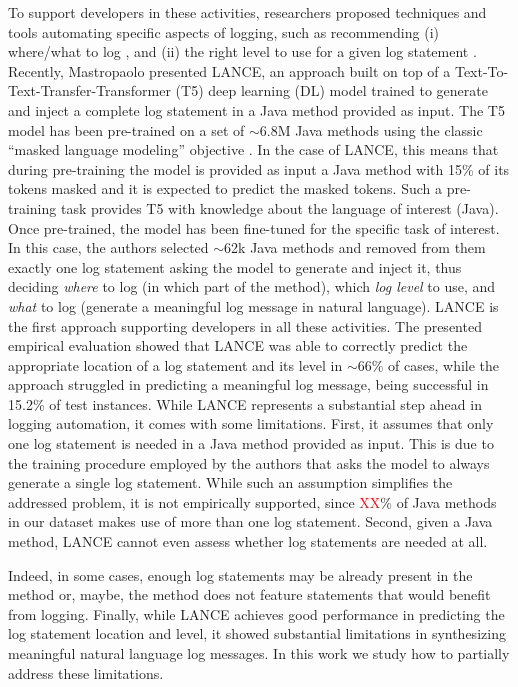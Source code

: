 To support developers in these activities, researchers proposed techniques and tools automating specific aspects of logging, such as recommending (i) where/what to log \cite{yuan2010sherlog,jia2018smartlog,li2018studying,li2020shall}, and (ii) the right level to use for a given log statement \cite{yuan2012characterizing,oliner2012advances,li2017log,li2020qualitative,li2021deeplv}. Recently, Mastropaolo \etal \cite{mastropaolo2022using} presented LANCE, an approach built on top of a Text-To-Text-Transfer-Transformer (T5) deep learning (DL) model \cite{raffel2019exploring} trained to generate and inject a complete log statement in a Java method provided as input. The T5 model has been pre-trained on a set of $\sim$6.8M Java methods using the classic ``masked language modeling'' objective \cite{raffel2019exploring}. In the case of LANCE, this means that during pre-training the model is provided as input a Java method with 15\% of its tokens masked and it is expected to predict the masked tokens. Such a pre-training task provides T5 with knowledge about the language of interest (\ie Java). Once pre-trained, the model has been fine-tuned for the specific task of interest. In this case, the authors selected $\sim$62k Java methods and removed from them exactly one log statement asking the model to generate and inject it, thus deciding \emph{where} to log (\ie in which part of the method), which \emph{log level} to use, and \emph{what} to log (\ie generate a meaningful log message in natural language). LANCE is the first approach supporting developers in all these activities. The presented empirical evaluation showed that LANCE was able to correctly predict the appropriate location of a log statement and its level in $\sim$66\% of cases, while the approach struggled in predicting a meaningful log message, being successful in 15.2\% of test instances. While LANCE represents a substantial step ahead in logging automation, it comes with some limitations. First, it assumes that only one log statement is needed in a Java method provided as input. This is due to the training procedure employed by the authors that asks the model to always generate a single log statement. While such an assumption simplifies the addressed problem, it is not empirically supported, since \textcolor{red}{XX}\% of Java methods in our dataset makes use of more than one log statement. Second, given a Java method, LANCE cannot even assess whether log statements are needed at all. 

\eject

Indeed, in some cases, enough log statements may be already present in the method or, maybe, the method does not feature statements that would benefit from logging. Finally,  while LANCE achieves good performance in predicting the log statement location and level, it showed substantial limitations in synthesizing meaningful natural language log messages. In this work we study how to partially address these limitations.

